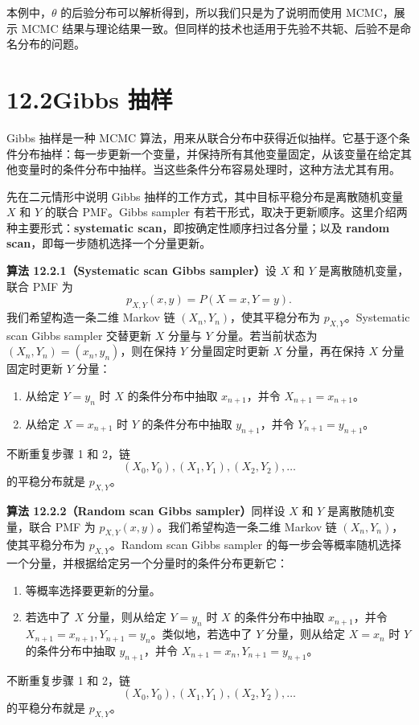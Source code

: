 \documentclass[UTF8, 12pt, fontset=fandol, oneside]{ctexart}
\begin{document}
本例中，$\theta$ 的后验分布可以解析得到，所以我们只是为了说明而使用 MCMC，展示 MCMC 结果与理论结果一致。但同样的技术也适用于先验不共轭、后验不是命名分布的问题。

\section*{12.2\quad Gibbs 抽样}

Gibbs 抽样是一种 MCMC 算法，用来从联合分布中获得近似抽样。它基于逐个条件分布抽样：每一步更新一个变量，并保持所有其他变量固定，从该变量在给定其他变量时的条件分布中抽样。当这些条件分布容易处理时，这种方法尤其有用。

先在二元情形中说明 Gibbs 抽样的工作方式，其中目标平稳分布是离散随机变量 $X$ 和 $Y$ 的联合 PMF。Gibbs sampler 有若干形式，取决于更新顺序。这里介绍两种主要形式：\textbf{systematic scan}，即按确定性顺序扫过各分量；以及 \textbf{random scan}，即每一步随机选择一个分量更新。

\noindent\textbf{算法 12.2.1（Systematic scan Gibbs sampler）}\quad 设 $X$ 和 $Y$ 是离散随机变量，联合 PMF 为
\[
  p_{X,Y}(x,y)=P(X=x,Y=y).
\]
我们希望构造一条二维 Markov 链 $(X_n,Y_n)$，使其平稳分布为 $p_{X,Y}$。Systematic scan Gibbs sampler 交替更新 $X$ 分量与 $Y$ 分量。若当前状态为 $(X_n,Y_n)=(x_n,y_n)$，则在保持 $Y$ 分量固定时更新 $X$ 分量，再在保持 $X$ 分量固定时更新 $Y$ 分量：
\begin{enumerate}
  \item 从给定 $Y=y_n$ 时 $X$ 的条件分布中抽取 $x_{n+1}$，并令 $X_{n+1}=x_{n+1}$。
  \item 从给定 $X=x_{n+1}$ 时 $Y$ 的条件分布中抽取 $y_{n+1}$，并令 $Y_{n+1}=y_{n+1}$。
\end{enumerate}
不断重复步骤 1 和 2，链
\[
  (X_0,Y_0),(X_1,Y_1),(X_2,Y_2),\ldots
\]
的平稳分布就是 $p_{X,Y}$。

\noindent\textbf{算法 12.2.2（Random scan Gibbs sampler）}\quad 同样设 $X$ 和 $Y$ 是离散随机变量，联合 PMF 为 $p_{X,Y}(x,y)$。我们希望构造一条二维 Markov 链 $(X_n,Y_n)$，使其平稳分布为 $p_{X,Y}$。Random scan Gibbs sampler 的每一步会等概率随机选择一个分量，并根据给定另一个分量时的条件分布更新它：
\begin{enumerate}
  \item 等概率选择要更新的分量。
  \item 若选中了 $X$ 分量，则从给定 $Y=y_n$ 时 $X$ 的条件分布中抽取 $x_{n+1}$，并令 $X_{n+1}=x_{n+1},Y_{n+1}=y_n$。类似地，若选中了 $Y$ 分量，则从给定 $X=x_n$ 时 $Y$ 的条件分布中抽取 $y_{n+1}$，并令 $X_{n+1}=x_n,Y_{n+1}=y_{n+1}$。
\end{enumerate}
不断重复步骤 1 和 2，链
\[
  (X_0,Y_0),(X_1,Y_1),(X_2,Y_2),\ldots
\]
的平稳分布就是 $p_{X,Y}$。
\end{document}
